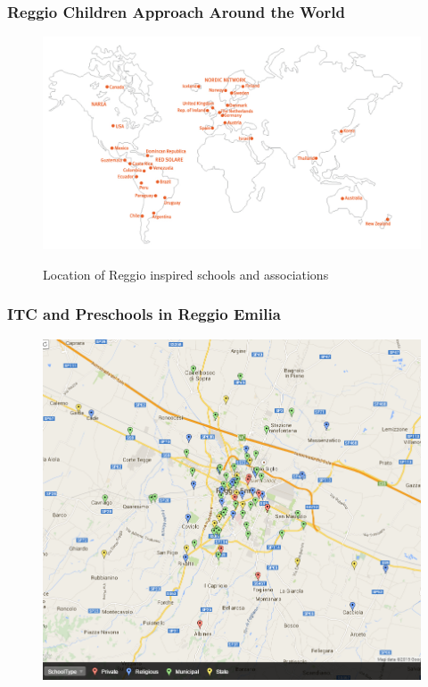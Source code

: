 \documentclass[xcolor=table]{beamer}
\begin{document}
\begin{frame}
\frametitle{Reggio Children Approach Around the World}
\hyperlink{frame:philosphy}{}
\begin{center}
\begin{figure}
\includegraphics[height=0.7\textheight]{network3.jpg}
\label{fig:World} 
\caption{{Location of Reggio inspired schools and associations}}
\end{figure}
\end{center}
\end{frame} 
\begin{frame}
\frametitle{ITC and Preschools in Reggio Emilia}
\begin{center}
\begin{figure}
\includegraphics[height=0.9\textheight]{ReggioSchools.png}
\label{fig:ReggioSchools} 
\hyperlink{frame:treatment}{}
\end{figure}
\end{center}
\end{frame} 
\end{document}
